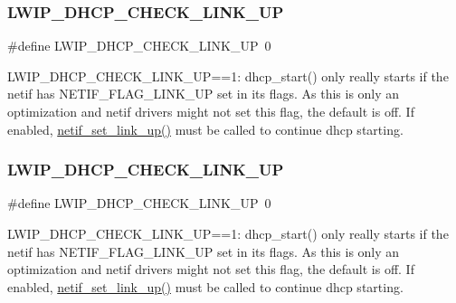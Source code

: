 \subsubsection{\texorpdfstring{L\+W\+I\+P\+\_\+\+D\+H\+C\+P\+\_\+\+C\+H\+E\+C\+K\+\_\+\+L\+I\+N\+K\+\_\+\+UP}{LWIP\_DHCP\_CHECK\_LINK\_UP}\hspace{0.1cm}{\footnotesize\ttfamily [1/2]}}
{\footnotesize\ttfamily \#define L\+W\+I\+P\+\_\+\+D\+H\+C\+P\+\_\+\+C\+H\+E\+C\+K\+\_\+\+L\+I\+N\+K\+\_\+\+UP~0}

L\+W\+I\+P\+\_\+\+D\+H\+C\+P\+\_\+\+C\+H\+E\+C\+K\+\_\+\+L\+I\+N\+K\+\_\+\+UP==1\+: dhcp\+\_\+start() only really starts if the netif has N\+E\+T\+I\+F\+\_\+\+F\+L\+A\+G\+\_\+\+L\+I\+N\+K\+\_\+\+UP set in its flags. As this is only an optimization and netif drivers might not set this flag, the default is off. If enabled, \hyperlink{group__netif_gae0d2975f189277990e9d5276fdd9e9ea}{netif\+\_\+set\+\_\+link\+\_\+up()} must be called to continue dhcp starting. \mbox{\label{group__lwip__opts__dhcp_ga1e9ec404a96581fdbc9d231a8a698a60}} 
\subsubsection{\texorpdfstring{L\+W\+I\+P\+\_\+\+D\+H\+C\+P\+\_\+\+C\+H\+E\+C\+K\+\_\+\+L\+I\+N\+K\+\_\+\+UP}{LWIP\_DHCP\_CHECK\_LINK\_UP}\hspace{0.1cm}{\footnotesize\ttfamily [2/2]}}
{\footnotesize\ttfamily \#define L\+W\+I\+P\+\_\+\+D\+H\+C\+P\+\_\+\+C\+H\+E\+C\+K\+\_\+\+L\+I\+N\+K\+\_\+\+UP~0}

L\+W\+I\+P\+\_\+\+D\+H\+C\+P\+\_\+\+C\+H\+E\+C\+K\+\_\+\+L\+I\+N\+K\+\_\+\+UP==1\+: dhcp\+\_\+start() only really starts if the netif has N\+E\+T\+I\+F\+\_\+\+F\+L\+A\+G\+\_\+\+L\+I\+N\+K\+\_\+\+UP set in its flags. As this is only an optimization and netif drivers might not set this flag, the default is off. If enabled, \hyperlink{group__netif_gae0d2975f189277990e9d5276fdd9e9ea}{netif\+\_\+set\+\_\+link\+\_\+up()} must be called to continue dhcp starting. \mbox{\label{group__lwip__opts__dhcp_ga2cc18315edcd5ffc083d1256f7d22a83}} 
